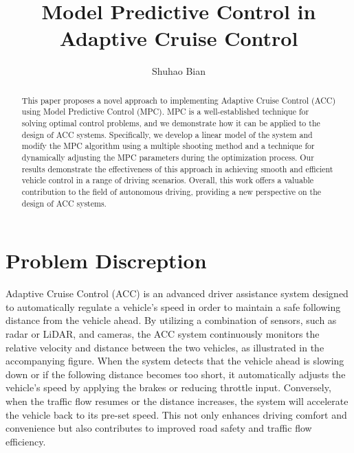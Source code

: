 \documentclass{article}
\title{Model Predictive Control in Adaptive Cruise Control}
\author{Shuhao Bian}
\numberwithin{equation}{section}
\begin{document}
\maketitle

\begin{abstract}
    This paper proposes a novel approach to implementing Adaptive Cruise Control (ACC)
    using Model Predictive Control (MPC). MPC is a well-established technique for solving
    optimal control problems, and we demonstrate how it can be applied to the design of ACC
    systems. Specifically, we develop a linear model of the system and modify the MPC algorithm
    using a multiple shooting method and a technique for dynamically adjusting the MPC parameters
    during the optimization process. Our results demonstrate the effectiveness of this approach in
    achieving smooth and efficient vehicle control in a range of driving scenarios. Overall, this
    work offers a valuable contribution to the field of autonomous driving, providing a new
    perspective on the design of ACC systems.
\end{abstract}

\section{Problem Discreption}


Adaptive Cruise Control (ACC) is an advanced driver assistance system designed
to automatically regulate a vehicle's speed in order to maintain a safe
following distance from the vehicle ahead. By utilizing a combination of
sensors, such as radar or LiDAR, and cameras, the ACC system continuously
monitors the relative velocity and distance between the two vehicles, as
illustrated in the accompanying figure. When the system detects that the
vehicle ahead is slowing down or if the following distance becomes too short,
it automatically adjusts the vehicle's speed by applying the brakes or reducing
throttle input. Conversely, when the traffic flow resumes or the distance
increases, the system will accelerate the vehicle back to its pre-set speed.
This not only enhances driving comfort and convenience but also contributes to
improved road safety and traffic flow efficiency.
\end{document}
